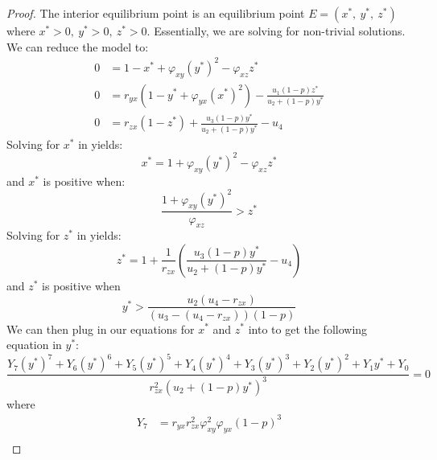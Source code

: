 \begin{proof}
    The interior equilibrium point is an equilibrium point $E=\left(x^*,\ y^*,\ z^*\right)$ where $x^*>0,\ y^*>0,\ z^*>0$. Essentially, we are solving  for non-trivial solutions. We can reduce the model to:
    \begin{subequations}\label{system:interior}
        \begin{align}
            0 &= 1-x^*+\varphi_{xy}\left(y^*\right)^2-\varphi_{xz}z^* \label{eq:interior-x}\\
            0 &= r_{yx}\left(1-y^*+\varphi_{yx}\left(x^*\right)^2\right)-\frac{u_1\left(1-p\right)z^*}{u_2+\left(1-p\right)y^*} \label{eq:interior-y}\\
            0 &= r_{zx}\left(1-z^*\right)+\frac{u_3\left(1-p\right)y^*}{u_2+\left(1-p\right)y^*}-u_4 \label{eq:interior-z}
        \end{align}
    \end{subequations}
    Solving for $x^*$ in  yields:
    \begin{equation*}
        x^*=1+\varphi_{xy}\left(y^*\right)^2-\varphi_{xz}z^*
    \end{equation*}
    and $x^*$ is positive when:
    \begin{equation*}
        \frac{1+\varphi_{xy}\left(y^*\right)^2}{\varphi_{xz}}>z^*
    \end{equation*}
    Solving for $z^*$ in  yields:
    \begin{equation*}
        z^*=1+\frac{1}{r_{zx}}\left(\frac{u_3\left(1-p\right)y^*}{u_2+\left(1-p\right)y^*}-u_4\right)
    \end{equation*}
    and $z^*$ is positive when
    \begin{equation*}
        y^*>\frac{u_2\left(u_4-r_{zx}\right)}{\left(u_3-\left(u_4-r_{zx}\right)\right)\left(1-p\right)}
    \end{equation*}
    We can then plug in our equations for $x^*$ and $z^*$ into  to get the following equation in $y^*$:
    \begin{equation}\label{eq:interior-Y}
        \frac{Y_7\left(y^*\right)^7+Y_6\left(y^*\right)^6+Y_5\left(y^*\right)^5+Y_4\left(y^*\right)^4+Y_3\left(y^*\right)^3+Y_2\left(y^*\right)^2+Y_1y^*+Y_0}{r_{zx}^2\left(u_2+\left(1-p\right)y^*\right)^3}=0
    \end{equation}
    where
    \begin{align*}
        Y_7 &= r_{yx}r_{zx}^2\varphi_{xy}^2\varphi_{yx}\left(1-p\right)^3\\

\end{align*}
\end{proof}
